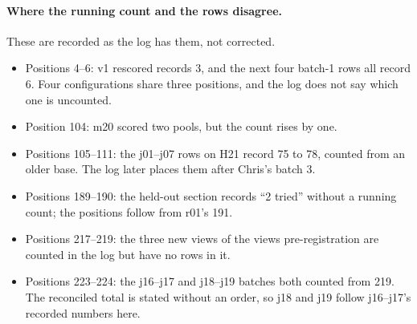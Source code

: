 \paragraph{Where the running count and the rows disagree.}
These are recorded as the log has them, not corrected.
\begin{itemize}
  \item Positions 4--6: v1 rescored records 3, and the next four batch-1 rows
        all record 6. Four configurations share three positions, and the log
        does not say which one is uncounted.
  \item Position 104: m20 scored two pools, but the count rises by one.
  \item Positions 105--111: the j01--j07 rows on H21 record 75 to 78, counted
        from an older base. The log later places them after Chris's batch 3.
  \item Positions 189--190: the held-out section records ``2 tried'' without a
        running count; the positions follow from r01's 191.
  \item Positions 217--219: the three new views of the views pre-registration
        are counted in the log but have no rows in it.
  \item Positions 223--224: the j16--j17 and j18--j19 batches both counted from
        219. The reconciled total is stated without an order, so j18 and j19
        follow j16--j17's recorded numbers here.
\end{itemize}

